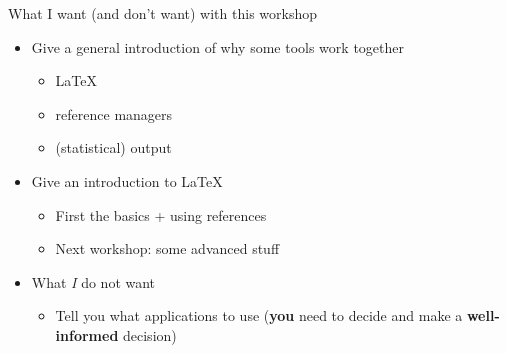 \documentclass[ignorenonframetext]{beamer}
\begin{document}
\begin{frame}{What I want (and don't want) with this workshop}

\begin{itemize}
\item
  Give a general introduction of why some tools work together

  \begin{itemize}
  \item \LaTeX{}
  \item reference managers
  \item (statistical) output
  \end{itemize}
\item
  Give an introduction to \LaTeX{}

  \begin{itemize}
	  \item First the basics + using references
	  \item Next workshop: some advanced stuff
  \end{itemize}
\item
  What \emph{I} do not want

  \begin{itemize}
  \item
    Tell you what applications to use (\textbf{you} need to decide and make a \textbf{well-informed} decision)
  \end{itemize}
\end{itemize}

\end{frame}
\end{document}
